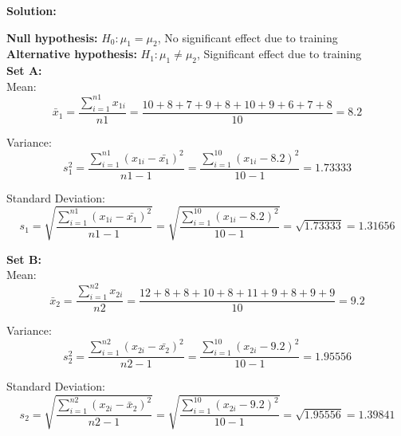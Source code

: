 \documentclass[a4paper,11pt,openright]{report}
\begin{document}
\begin{enumerate}
\textbf{Solution:}

\textbf{Null hypothesis:} $H_{0}: \mu_{1} = \mu_{2}$, \hspace{2px} No significant effect due
to training \\
\textbf{Alternative hypothesis:} $H_{1}: \mu_{1} \neq \mu_{2}$, \hspace{2px} Significant
effect due to training \\

\textbf{Set A:} \\ 
\hspace*{10mm} Mean:
\begin{equation*}
\bar x_{1} = \frac{\sum\limits_{i=1}^{n1} x_{1i}}{n1}
    	= \frac{10 + 8 + 7 + 9 + 8 + 10 + 9 + 6 + 7 + 8}{10}
    	= 8.2
\end{equation*}

\hspace*{10mm} Variance:
\begin{equation*}
s_{1}^{2} = \frac{\sum\limits_{i=1}^{n1} (x_{1i} - \bar {x_{1}})^{2}}{n1 - 1}
		= \frac{\sum\limits_{i=1}^{10} (x_{1i} - 8.2)^{2}}{10 -1} = 1.73333
\end{equation*}

\hspace*{10mm} Standard Deviation:
\begin{equation*}
s_{1} = \sqrt{\frac{\sum\limits_{i=1}^{n1} (x_{1i} - \bar {x_{1}})^{2}}{n1 - 1}}
	= \sqrt{\frac{\sum\limits_{i=1}^{10} (x_{1i} - 8.2)^{2}}{10 -1}}
	= \sqrt{1.73333} = 1.31656
\end{equation*}

\textbf{Set B:} \\
\hspace*{10mm} Mean:
\begin{equation*}
\bar x_{2} = \frac{\sum\limits_{i=1}^{n2} x_{2i}}{n2}
	= \frac{12 + 8 + 8 + 10 + 8 + 11 + 9 + 8 + 9 + 9}{10}
	= 9.2
\end{equation*}

\hspace*{10mm} Variance:
\begin{equation*}
s_{2}^{2} = \frac{\sum\limits_{i=1}^{n2} (x_{2i} - \bar {x_{2}})^{2}}{n2 - 1}
= \frac{\sum\limits_{i=1}^{10} (x_{2i} - 9.2)^{2}}{10 -1} = 1.95556
\end{equation*}

\hspace*{10mm} Standard Deviation:
\begin{equation*}
s_{2} = \sqrt{\frac{\sum\limits_{i=1}^{n2} (x_{2i} - \bar x_{2})^{2}}{n2 - 1}}
= \sqrt{\frac{\sum\limits_{i=1}^{10} (x_{2i} - 9.2)^{2}}{10 -1}}
= \sqrt{1.95556} = 1.39841
\end{equation*}


\end{enumerate}
\end{document}
